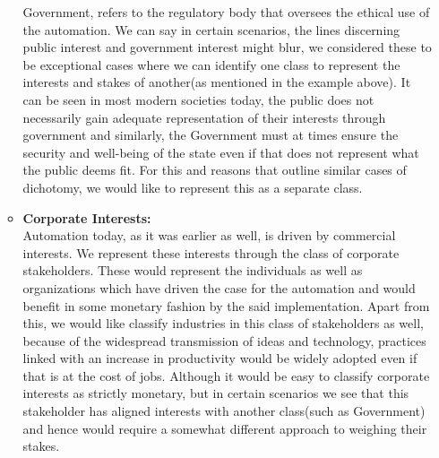 \begin{enumerate}[a]
\begin{itemize}
Government, refers to the regulatory body that oversees the ethical use of the automation. We can say in certain scenarios, the lines discerning public interest and government interest might blur, we considered these to be exceptional cases where we can identify one class to represent the interests and stakes of another(as mentioned in the example above). It can be seen in most modern societies today, the public does not necessarily gain adequate representation of their interests through government and similarly, the Government must at times ensure the security and well-being of the state even if that does not represent what the public deems fit. For this and reasons that outline similar cases of dichotomy, we would like to represent this as a separate class.
\item \textbf{Corporate Interests:}\\
Automation today, as it was earlier as well, is driven by commercial interests. We represent these interests through the class of corporate stakeholders. These would represent the individuals as well as organizations which have driven the case for the automation and would benefit in some monetary fashion by the said implementation. Apart from this, we would like classify industries in this class of stakeholders as well, because of the widespread transmission of ideas and technology, practices linked with an increase in productivity would be widely adopted even if that is at the cost of jobs. Although it would be easy to classify corporate interests as strictly monetary, but in certain scenarios we see that this stakeholder has aligned interests with another class(such as Government) and hence would require a somewhat different approach to weighing their stakes.\\ 
\end{itemize}
\end{enumerate}


